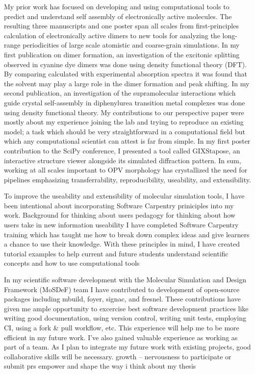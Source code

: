 My prior work has focused on developing and using computational tools to predict and understand self assembly of electronically active molecules.
The resulting three manuscripts and one poster span all scales from first-principles calculation of electronically active dimers to new tools for analyzing the long-range periodicities of large scale atomistic and coarse-grain simulations.
In my first publication on dimer formation, an investigation of the excitonic splitting observed in cyanine dye dimers was done using density functional theory (DFT)\cite{Fothergill2018}.
By comparing calculated with experimental absorption spectra it was found that the solvent may play a large role in the dimer formation and peak shifting.
In my second publication, an investigation of the supramolecular interactions which guide crystal self-assembly in diphenylurea transition metal complexes was done using density functional theory\cite{Millard2019a}. 
My contributions to our perspective paper were mostly about my experience joining the lab and trying to reproduce an existing model; a task which should be very straightforward in a computational field but which any computational scientist can attest is far from simple\cite{Jankowski2019}. 
In my first poster contribution to the SciPy conference, I presented a tool called GIXStapose, an interactive structure viewer alongside its simulated diffraction pattern\cite{gixstapose, scipy2020}.
In sum, working at all scales important to OPV morphology has crystallized the need for pipelines emphasizing transferrability, reproducibility, useability, and extensibility.

To improve the useability and extensibility of molecular simulation tools, I have been intentional about incorporating Software Carpentry priniciples into my work.
Background for thinking about users
pedagogy for thinking about how users take in new information
useability
I have completed Software Carpentry training which has taught me how to break down complex ideas and give learners a chance to use their knowledge.
With these principles in mind, I have created tutorial examples to help current and future students understand scientific concepts and how to use computational tools\cite{notebooktutorials}

In my scientific software development with the Molecular Simulation and Design Framework (MoSDeF) team
I have contributed to development of open-source packages including mbuild, foyer, signac, and fresnel\cite{mbuild, foyer, signac, fresnel}.
These contributions have given me ample opportunity to excercise best software development practices like writing good documentation, using version control, writing unit tests, employing CI, using a fork \& pull workflow, etc.
This experience will help me to be more efficient in my future work.
I've also gained valuable experience as working as part of a team.
As I plan to integrate my future work with existing projects, good collaborative skills will be necessary.
growth -- nervousness to participate or submit prs empower and shape the way i think about my thesis

